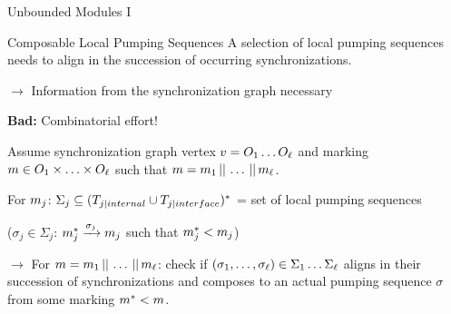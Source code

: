 \documentclass[11pt]{presentation}
\begin{document}
\begin{frame}{Unbounded Modules I}
	\begin{merke}{Composable Local Pumping Sequences}{}
		A selection of local pumping sequences needs to align in the succession of occurring synchronizations.
	\end{merke}

	$ \rightarrow $ Information from the synchronization graph necessary
	\medskip

	\textbf{Bad:}
	Combinatorial effort!

	\medskip
	{\small

		Assume synchronization graph vertex $ v = \segment[1] \dotsc \segment[\modulecard] $ and marking $ \marking \in  \segment[1] \times \dotsc \times \segment[\modulecard] $ such that $ \concatmarking $.

		\medskip
		For $ \localmarking{j} $: $ \Sigma_j \subseteq (\internals[j] \cup \interfaces[j])^* $ = set of local pumping sequences

		($ \sigma_j \in \Sigma_j $: $ \localmarking{j}^* \xrightarrow{\sigma_j} \localmarking{j} $ such that $ \localmarking{j}^* < \localmarking{j} $)

		\medskip
		$ \rightarrow $ For $ \concatmarking $: check if $ (\sigma_1,\dotsc,\sigma_\ell) \in \Sigma_1 \dotsc \Sigma_\ell $ aligns in their succession of synchronizations and composes to an actual pumping sequence $ \sigma $ from some marking $ \marking^* < \marking $.}
\end{frame}
\end{document}

